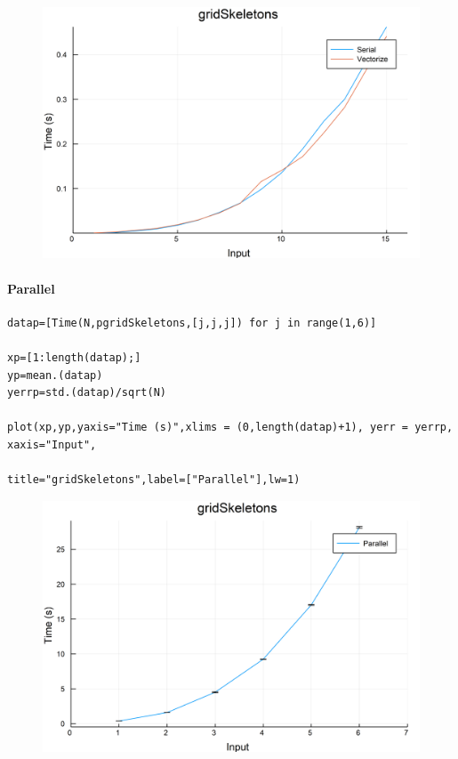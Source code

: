 \documentclass{article}
\begin{document}
\begin{figure}[h!]
\centering
\includegraphics[scale=0.06]{gridSkeletonsCom1.png}
\end{figure}

\paragraph{Parallel}
\begin{flushleft}\small
\begin{list}{}{} \item
    \begin{Verbatim}[tabsize=4]
datap=[Time(N,pgridSkeletons,[j,j,j]) for j in range(1,6)]

xp=[1:length(datap);]
yp=mean.(datap)
yerrp=std.(datap)/sqrt(N)

plot(xp,yp,yaxis="Time (s)",xlims = (0,length(datap)+1), yerr = yerrp, xaxis="Input", 
                                            title="gridSkeletons",label=["Parallel"],lw=1)
    \end{Verbatim}
\end{list}
\end{flushleft}

\begin{figure}[h!]
\centering
\includegraphics[scale=0.06]{gridSkeletonsPar.png}
\end{figure}
\newpage
\end{document}
